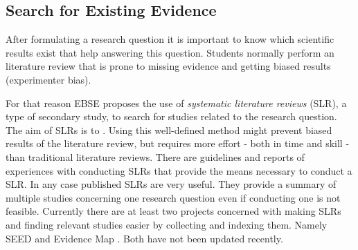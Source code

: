 
\subsection{Search for Existing Evidence}
\label{subsec:search for existing evidence} 

After formulating a research question it is important to know which scientific results exist that help answering this question. Students normally perform an  literature review that is prone to missing evidence and getting biased results (experimenter bias).

For that reason EBSE proposes the use of \emph{systematic literature reviews} (SLR), a type of secondary study, to search for studies related to the research question. The aim of SLRs is to  \cite{Zhang2011}. Using this well-defined method might prevent biased results of the literature review, but requires more effort - both in time and skill - than traditional literature reviews. There are guidelines \cite{keele2007,Wohlin2014,Zhang2011} and reports of experiences with conducting SLRs \cite{Brereton2007} that provide the means necessary to conduct a SLR. In any case published SLRs are very useful. They provide a summary of multiple studies concerning one research question even if conducting one is not feasible. Currently there are at least two projects concerned with making SLRs and finding relevant studies easier by collecting and indexing them. Namely SEED \cite{Janzen2008} and Evidence Map \cite{EBSEWeb}. Both have not been updated recently.


